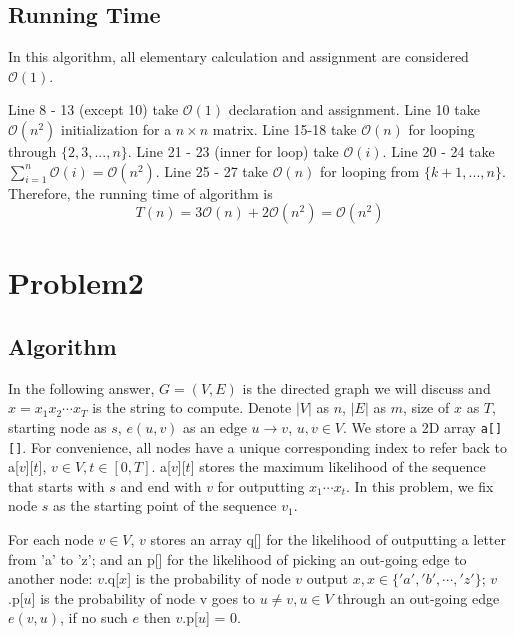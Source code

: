 \documentclass[openany]{article}
\begin{document}
\subsection*{Running Time}
In this algorithm, all elementary calculation and assignment are considered $\mathcal{O}(1)$.

Line 8 - 13 (except 10) take $\mathcal{O}(1)$ declaration and assignment. Line 10 take $\mathcal{O}(n^2)$ initialization for a $n\times n$ matrix. Line 15-18 take $\mathcal{O}(n)$ for looping through $\{2,3,...,n\}$. Line 21 - 23 (inner for loop) take $\mathcal{O}(i)$. Line 20 - 24 take $\sum_{i=1}^{n}\mathcal{O}(i) = \mathcal{O}(n^2)$. Line 25 - 27 take $\mathcal{O}(n)$ for looping from $\{k+1,...,n\}$. Therefore, the running time of algorithm is
\[T(n) = 3\mathcal{O}(n) + 2\mathcal{O}(n^2) = \mathcal{O}(n^2)\]


\section*{Problem2}

\subsection*{Algorithm}
In the following answer, $G = (V,E)$ is the directed graph we will discuss and $x=x_1x_2\cdots x_T$ is the string to compute. Denote $|V|$ as $n$, $|E|$ as $m$, size of $x$ as $T$, starting node as $s$, $e(u,v)$ as an edge $u \rightarrow v$, $u,v\in V$. We store a 2D array \texttt{a[][]}. For convenience, all nodes have a unique corresponding index to refer back to a[$v$][$t$], $v\in V, t\in [0, T]$. a[$v$][$t$] stores the maximum likelihood of the sequence that starts with $s$ and end with $v$ for outputting $x_1\cdots x_t$. In this problem, we fix node $s$ as the starting point of the sequence $v_1$.

For each node $v\in V$, $v$ stores an array q[] for the likelihood of outputting a letter from 'a' to 'z'; and an p[] for the likelihood of picking an out-going edge to another node: $v$.q[$x$] is the probability of node $v$ output $x, x \in \{'a','b', \cdots, 'z'\}$; $v$.p[$u$] is the probability of node v goes to $u \neq v, u \in V$ through an out-going edge $e(v,u)$, if no such $e$ then $v$.p[$u$] = 0. 
\end{document}
